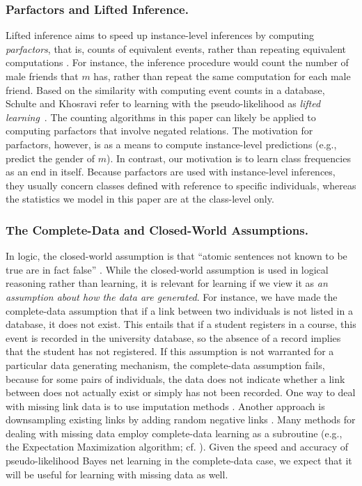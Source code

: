 \documentclass[oribibl]{llncs}
\begin{document}
\subsubsection{Parfactors and Lifted Inference.} Lifted inference aims to speed up instance-level inferences by computing {\em parfactors}, that is, counts of equivalent events, rather than repeating equivalent computations \cite{Poole2003}. 
For instance, the inference procedure would count the number of male friends that $m$ has, rather than repeat the same computation for each male friend. 
Based on the similarity with computing event counts in a database, Schulte and Khosravi refer to learning with the pseudo-likelihood as {\em lifted learning}~\cite{Schulte2012}. 
The counting algorithms in this paper can likely be applied to computing parfactors that involve negated relations. The motivation for parfactors, however, is as a means to compute instance-level predictions (e.g., predict the gender of $m$). In contrast, our motivation is to learn class frequencies as an end in itself. Because parfactors are used with instance-level inferences, they usually concern classes defined with reference to specific individuals, whereas the statistics we model in this paper are at the class-level only.



\subsubsection{The Complete-Data and Closed-World Assumptions.} In logic, the closed-world assumption is that ``atomic sentences not known to be true are in fact false'' \cite[Ch.8.2.8]{Russell2010}.  While the closed-world assumption is used in logical reasoning rather than learning, it is relevant for learning if we view it as {\em an assumption about how the data are generated}. For instance, we have made the complete-data assumption that if a link between two individuals is not listed in a database, it does not exist. This entails that if a student registers in a course, this event is recorded in the university database, so the absence of a record implies that the student has not registered. If this assumption is not warranted for a particular data generating mechanism, the complete-data assumption fails, because for some pairs of individuals, the data does not indicate whether a link between does not actually exist or simply has not been recorded. One way to deal with missing link data is to  use imputation methods \cite{Hoff2007,Namata2011}. %
Another approach is downsampling existing links by adding random negative links \cite{Khot2011,Yang2011}. Many methods for dealing with missing data employ complete-data learning as a subroutine (e.g., the Expectation Maximization algorithm; cf. \cite[Ch.4.3]{Domingos2009}). Given the speed and accuracy of pseudo-likelihood Bayes net learning in the complete-data case, we expect that it will be useful for learning with missing data as well.
 
\end{document}
